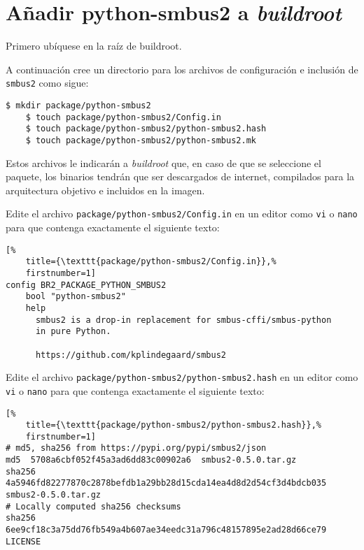%
%


\cleardoublepage{}
\section{Añadir python-smbus2 a \emph{buildroot}}%
\label{sec:add-smbus2}

Primero ubíquese en la raíz de buildroot.

A continuación cree un directorio para los archivos de configuración e inclusión de \texttt{smbus2} como sigue:

\begin{Verbatim}[gobble=1]
	$ mkdir	package/python-smbus2
	$ touch	package/python-smbus2/Config.in
	$ touch package/python-smbus2/python-smbus2.hash
	$ touch package/python-smbus2/python-smbus2.mk
\end{Verbatim}

Estos archivos le indicarán a \emph{buildroot} que, en caso de que se seleccione el paquete, los binarios tendrán que ser descargados de internet, compilados para la arquitectura objetivo e incluidos en la imagen.

Edite el archivo \texttt{package/python-smbus2/Config.in} en un editor como \texttt{vi} o \texttt{nano} para que contenga exactamente el siguiente texto:

\begin{lstlisting}[%
	title={\texttt{package/python-smbus2/Config.in}},%
	firstnumber=1]
config BR2_PACKAGE_PYTHON_SMBUS2
	bool "python-smbus2"
	help
	  smbus2 is a drop-in replacement for smbus-cffi/smbus-python
	  in pure Python.

	  https://github.com/kplindegaard/smbus2
\end{lstlisting}

Edite el archivo \texttt{package/python-smbus2/python-smbus2.hash} en un editor como \texttt{vi} o \texttt{nano} para que contenga exactamente el siguiente texto:

\begin{lstlisting}[%
	title={\texttt{package/python-smbus2/python-smbus2.hash}},%
	firstnumber=1]
# md5, sha256 from https://pypi.org/pypi/smbus2/json
md5  5708a6cbf052f45a3ad6dd83c00902a6  smbus2-0.5.0.tar.gz
sha256  4a5946fd82277870c2878befdb1a29bb28d15cda14ea4d8d2d54cf3d4bdcb035  smbus2-0.5.0.tar.gz
# Locally computed sha256 checksums
sha256  6ee9cf18c3a75dd76fb549a4b607ae34eedc31a796c48157895e2ad28d66ce79  LICENSE
\end{lstlisting}

